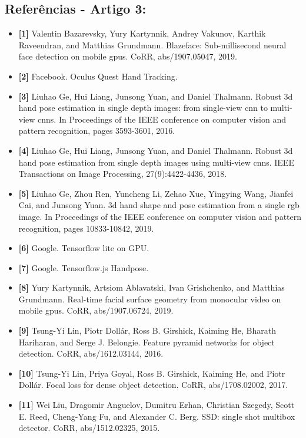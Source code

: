 \documentclass[12pt, a4paper]{article}
\begin{document}
\subsection{Referências - Artigo 3:}
\begin{itemize}[label=]
    \item \textbf{[1]} Valentin Bazarevsky, Yury Kartynnik, Andrey Vakunov, Karthik Raveendran, and Matthias Grundmann. Blazeface: Sub-millisecond neural face detection on mobile gpus. CoRR, abs/1907.05047, 2019.
    \item \textbf{[2]} Facebook. Oculus Quest Hand Tracking.
    \item \textbf{[3]} Liuhao Ge, Hui Liang, Junsong Yuan, and Daniel Thalmann. Robust 3d hand pose estimation in single depth images: from single-view cnn to multi-view cnns. In Proceedings of the IEEE conference on computer vision and pattern recognition, pages 3593-3601, 2016.
    \item \textbf{[4]} Liuhao Ge, Hui Liang, Junsong Yuan, and Daniel Thalmann. Robust 3d hand pose estimation from single depth images using multi-view cnns. IEEE Transactions on Image Processing, 27(9):4422-4436, 2018.
    \item \textbf{[5]} Liuhao Ge, Zhou Ren, Yuncheng Li, Zehao Xue, Yingying Wang, Jianfei Cai, and Junsong Yuan. 3d hand shape and pose estimation from a single rgb image. In Proceedings of the IEEE conference on computer vision and pattern recognition, pages 10833-10842, 2019.
    \item \textbf{[6]} Google. Tensorflow lite on GPU.
    \item \textbf{[7]} Google. Tensorflow.js Handpose.
    \item \textbf{[8]} Yury Kartynnik, Artsiom Ablavatski, Ivan Grishchenko, and Matthias Grundmann. Real-time facial surface geometry from monocular video on mobile gpus. CoRR, abs/1907.06724, 2019.
    \item \textbf{[9]} Tsung-Yi Lin, Piotr Dollár, Ross B. Girshick, Kaiming He, Bharath Hariharan, and Serge J. Belongie. Feature pyramid networks for object detection. CoRR, abs/1612.03144, 2016.
    \item \textbf{[10]} Tsung-Yi Lin, Priya Goyal, Ross B. Girshick, Kaiming He, and Piotr Dollár. Focal loss for dense object detection. CoRR, abs/1708.02002, 2017.
    \item \textbf{[11]} Wei Liu, Dragomir Anguelov, Dumitru Erhan, Christian Szegedy, Scott E. Reed, Cheng-Yang Fu, and Alexander C. Berg. SSD: single shot multibox detector. CoRR, abs/1512.02325, 2015.

\end{itemize}
\end{document}
